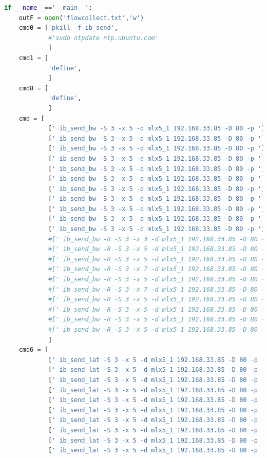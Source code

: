 \documentclass[12pt,a4paper]{article}
\begin{document}
\begin{lstlisting}[language=Python]
if __name__=='__main__':
    outF = open('flowcollect.txt','w')
    cmd0 = ['pkill -f ib_send',
            #'sudo ntpdate ntp.ubuntu.com'
            ]
    cmd1 = [
            'define',
            ]
    cmd8 = [
            'define',
            ]
    cmd = [
            [' ib_send_bw -S 3 -x 5 -d mlx5_1 192.168.33.85 -D 80 -p '],
            [' ib_send_bw -S 3 -x 5 -d mlx5_1 192.168.33.85 -D 80 -p '],
            [' ib_send_bw -S 3 -x 5 -d mlx5_1 192.168.33.85 -D 80 -p '],
            [' ib_send_bw -S 3 -x 5 -d mlx5_1 192.168.33.85 -D 80 -p '],
            [' ib_send_bw -S 3 -x 5 -d mlx5_1 192.168.33.85 -D 80 -p '],
            [' ib_send_bw -S 3 -x 5 -d mlx5_1 192.168.33.85 -D 80 -p '],
            [' ib_send_bw -S 3 -x 5 -d mlx5_1 192.168.33.85 -D 80 -p '],
            [' ib_send_bw -S 3 -x 5 -d mlx5_1 192.168.33.85 -D 80 -p '],
            [' ib_send_bw -S 3 -x 5 -d mlx5_1 192.168.33.85 -D 80 -p '],
            [' ib_send_bw -S 3 -x 5 -d mlx5_1 192.168.33.85 -D 80 -p '],
            [' ib_send_bw -S 3 -x 5 -d mlx5_1 192.168.33.85 -D 80 -p '],
            #[' ib_send_bw -R -S 3 -x 3 -d mlx5_1 192.168.33.85 -D 80 -p '],
            #[' ib_send_bw -R -S 3 -x 5 -d mlx5_1 192.168.33.85 -D 80 -p '],
            #[' ib_send_bw -R -S 3 -x 5 -d mlx5_1 192.168.33.85 -D 80 -p '],
            #[' ib_send_bw -R -S 3 -x 7 -d mlx5_1 192.168.33.85 -D 80 -p '],
            #[' ib_send_bw -R -S 3 -x 5 -d mlx5_1 192.168.33.85 -D 80 -p '],
            #[' ib_send_bw -R -S 3 -x 7 -d mlx5_1 192.168.33.85 -D 80 -p '],
            #[' ib_send_bw -R -S 3 -x 5 -d mlx5_1 192.168.33.85 -D 80 -p '],
            #[' ib_send_bw -R -S 3 -x 5 -d mlx5_1 192.168.33.85 -D 80 -p '],
            #[' ib_send_bw -R -S 3 -x 5 -d mlx5_1 192.168.33.85 -D 80 -p '],
            #[' ib_send_bw -R -S 3 -x 5 -d mlx5_1 192.168.33.85 -D 80 -p '],
            ]
    cmd6 = [
            [' ib_send_lat -S 3 -x 5 -d mlx5_1 192.168.33.85 -D 80 -p '],
            [' ib_send_lat -S 3 -x 5 -d mlx5_1 192.168.33.85 -D 80 -p '],
            [' ib_send_lat -S 3 -x 5 -d mlx5_1 192.168.33.85 -D 80 -p '],
            [' ib_send_lat -S 3 -x 5 -d mlx5_1 192.168.33.85 -D 80 -p '],
            [' ib_send_lat -S 3 -x 5 -d mlx5_1 192.168.33.85 -D 80 -p '],
            [' ib_send_lat -S 3 -x 5 -d mlx5_1 192.168.33.85 -D 80 -p '],
            [' ib_send_lat -S 3 -x 5 -d mlx5_1 192.168.33.85 -D 80 -p '],
            [' ib_send_lat -S 3 -x 5 -d mlx5_1 192.168.33.85 -D 80 -p '],
            [' ib_send_lat -S 3 -x 5 -d mlx5_1 192.168.33.85 -D 80 -p '],
            [' ib_send_lat -S 3 -x 5 -d mlx5_1 192.168.33.85 -D 80 -p '],

\end{lstlisting}
\end{document}
